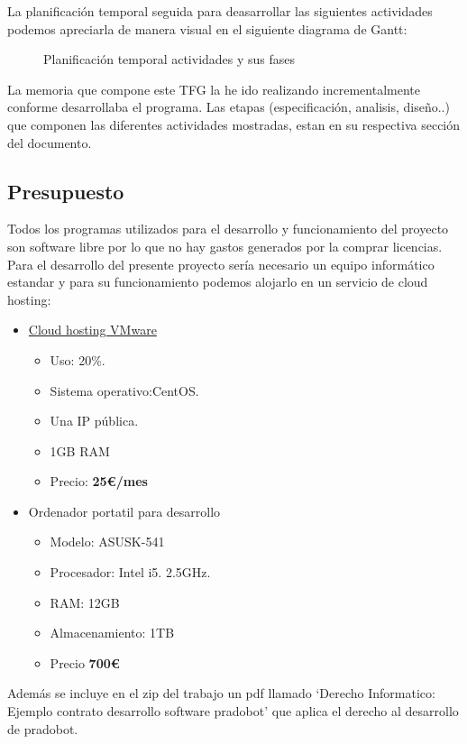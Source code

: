  La planificación temporal seguida para deasarrollar las siguientes actividades podemos apreciarla de manera visual en el siguiente diagrama de Gantt:

\begin{figure}[H] %
\centering
{}  %

\caption{Planificación temporal actividades y sus fases }\label{figura666}
\end{figure}



La memoria que compone este TFG la  he ido realizando incrementalmente conforme desarrollaba el programa. Las etapas (especificación, analisis, diseño..) que componen las diferentes actividades mostradas,  estan en su respectiva sección del documento.

\subsection{Presupuesto}

Todos los programas utilizados para el desarrollo y funcionamiento del proyecto son software libre por lo que no hay  gastos generados por la comprar licencias.
Para el desarrollo del presente proyecto sería necesario un equipo informático estandar y para su funcionamiento podemos alojarlo en un servicio de cloud hosting:

\begin{itemize}
\item \href{http://vcloud.vmware.com/service-offering/pricing-calculator/on-demand}{Cloud hosting VMware}
\begin{itemize}
\item Uso: 20\%.
\item Sistema operativo:CentOS.
\item Una IP pública.
\item 1GB RAM
\item Precio: \textbf{25\euro/mes}
\end{itemize}
\item Ordenador portatil para desarrollo
\begin{itemize}
\item Modelo: ASUSK-541
\item Procesador: Intel i5. 2.5GHz.
\item RAM: 12GB
\item Almacenamiento: 1TB
\item Precio \textbf{700\euro}
\end{itemize}
\end{itemize}

Además se incluye en el zip del trabajo un pdf llamado \enquote*{Derecho Informatico: Ejemplo contrato desarrollo software pradobot} que aplica el derecho al desarrollo de pradobot.